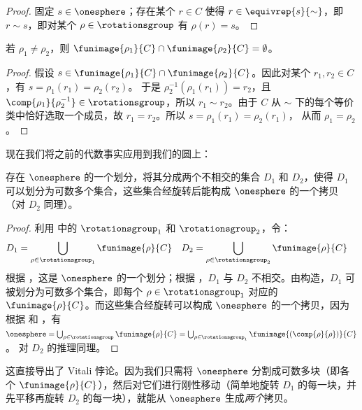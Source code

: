 \documentclass[../../../include/open-logic-section]{subfiles}
\begin{document}
\begin{proof}
固定 $s \in \onesphere$；存在某个 $r \in C$ 使得 $r \in
\equivrep{s}{\sim}$，即 $r \sim s$，即对某个 $\rho \in \rotationsgroup$ 有 $\rho(r) = s$。
\end{proof}

\begin{lem}
若 $\rho_1 \neq \rho_2$，则 $\funimage{\rho_1}{C} \cap \funimage{\rho_2}{C} = \emptyset$。
\end{lem}

\begin{proof}
假设 $s \in \funimage{\rho_{1}}{C} \cap \funimage{\rho_{2}}{C}$。因此对某个 $r_{1}, r_{2} \in C$，有 $s = \rho_{1}(r_{1}) = \rho_{2}(r_{2})$。
于是 $\rho^{-1}_2(\rho_1(r_1)) = r_2$，且 $\comp{\rho_1}{\rho^{-1}_2} \in \rotationsgroup$，所以 $r_{1} \sim
r_{2}$。由于 $C$ 从 $\sim$ 下的每个等价类中恰好选取一个成员，故 $r_1 = r_2$。所以 $s = \rho_1(r_1) = \rho_2(r_1)$，
从而 $\rho_1 = \rho_2$。
\end{proof}


现在我们将之前的代数事实应用到我们的圆上：

\begin{lem}
存在 $\onesphere$ 的一个划分，将其分成两个不相交的集合 $D_{1}$
和 $D_{2}$，使得 $D_{1}$ 可以划分为可数多个集合，这些集合经旋转后能构成 $\onesphere$ 的一个拷贝（对 $D_2$ 同理）。
\end{lem}

\begin{proof}
利用  中的 $\rotationsgroup_{1}$ 和 $\rotationsgroup_{2}$，令：
\begin{align*}
	D_{1} &= \bigcup_{\rho \in \rotationsgroup_1} \funimage{\rho}{C} &
	D_{2} &= \bigcup_{\rho \in \rotationsgroup_2} \funimage{\rho}{C}
\end{align*}
根据 ，这是 $\onesphere$ 的一个划分；根据 ，$D_1$ 与 $D_2$ 不相交。由构造，$D_1$ 可被划分为可数多个集合，即每个 $\rho \in \rotationsgroup_1$ 对应的 $\funimage{\rho}{C}$。而这些集合经旋转可以构成 $\onesphere$ 的一个拷贝，因为根据  和 ，有 $\onesphere = \bigcup_{\rho \in
\rotationsgroup}\funimage{\rho}{C} = \bigcup_{\rho \in
\rotationsgroup_1}\funimage{(\comp{\rho}{\rho})}{C}$。
对 $D_2$ 的推理同理。\end{proof}

\noindent 这直接导出了 Vitali 悖论。因为我们只需将 $\onesphere$ 分割成可数多块（即各个 $\funimage{\rho}{C}$），然后对它们进行刚性移动（简单地旋转 $D_1$ 的每一块，并先平移再旋转 $D_2$ 的每一块），就能从 $\onesphere$ 生成\emph{两个}拷贝。
\end{document}
